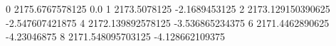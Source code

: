 0 2175.6767578125 0.0
1 2173.5078125 -2.1689453125
2 2173.129150390625 -2.547607421875
4 2172.139892578125 -3.536865234375
6 2171.4462890625 -4.23046875
8 2171.548095703125 -4.128662109375
